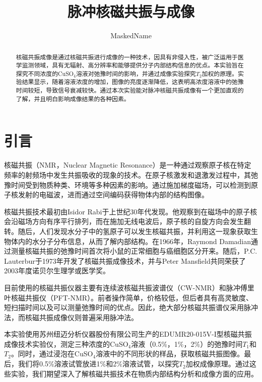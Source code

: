 \documentclass[font=default]{mpltx}
\begin{document}
\title{脉冲核磁共振与成像} %
\author{MaskedName} %
\date{}
\begin{abstract}
  核磁共振成像是通过核磁共振进行成像的一种技术，因具有非侵入性，被广泛运用于医学监测领域，具有无辐射、高分辨率和能够提供分子内部结构信息的优点。本实验旨在探究不同浓度的CuSO$_4$溶液对弛豫时间的影响，并通过成像实验探究$T_2$加权的原理。实验结果显示，随着溶液浓度的增加，图像的亮度逐渐降低，这表明高浓度溶液中的弛豫时间较短，导致信号衰减较快。通过本次实验能对脉冲核磁共振成像有一个更加直观的了解，并且明白影响成像结果的各种因素。
\end{abstract}

\maketitle

\section{引言}
核磁共振（NMR，Nuclear Magnetic Resonance）是一种通过观察原子核在特定频率的射频场中发生共振吸收的现象的技术。在原子核激发和退激发过程中，其弛豫时间受到物质种类、环境等多种因素的影响。通过施加梯度磁场，可以检测到原子核发射的电磁波，进而通过空间编码获得物体内部的结构图像。

核磁共振技术最初由Isidor Rabi于上世纪30年代发现。他观察到在磁场中的原子核会沿磁场方向有序平行排列，而在施加无线电波后，原子核的自旋方向会发生翻转\cite{rabi1938new}。随后，人们发现水分子中的氢原子可以发生核磁共振，并利用这一现象获取生物体内的水分子分布信息，从而了解内部结构。在1966年，Raymond Damadian通过测量核磁共振的弛豫时间首次将小鼠的正常细胞与癌细胞区分开来。随后，P.C. Lauterbur于1973年开发了核磁共振成像技术\cite{lauterbur1973image}，并与Peter Mansfield共同荣获了2003年度诺贝尔生理学或医学奖。

目前使用的核磁共振仪器主要有连续波核磁共振波谱仪（CW-NMR）和脉冲傅里叶核磁共振仪（PFT-NMR）。前者操作简单，价格较低，但后者具有高灵敏度、短扫描时间以及可以测量弛豫时间的优点。因此，绝大部分核磁共振谱仪采用脉冲法，而核磁共振成像仪则普遍采用脉冲法\cite{book}。

本实验使用苏州纽迈分析仪器股份有限公司生产的EDUMR20-015V-I型核磁共振成像技术实验仪，测定三种浓度的CuSO$_4$溶液（0.5\%，1\%，2\%）的弛豫时间$T_1$和$T_2$。同时，通过浸泡在CuSO$_4$溶液中的不同形状的样品，获取核磁共振图像。最后，我们将0.5\%溶液试管放进1\%和2\%溶液试管，以探究$T_2$加权成像原理。通过这些实验，我们期望深入了解核磁共振技术在物质内部结构分析和成像方面的应用。
\end{document}
